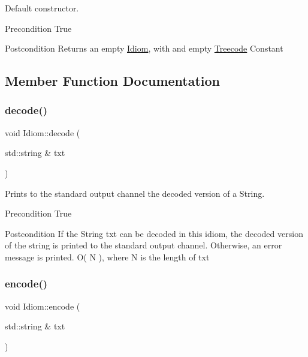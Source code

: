 Default constructor. 

\begin{DoxyPrecond}{Precondition}
True 
\end{DoxyPrecond}
\begin{DoxyPostcond}{Postcondition}
Returns an empty \hyperlink{classIdiom}{Idiom}, with and empty \hyperlink{classTreecode}{Treecode}  Constant 
\end{DoxyPostcond}


\subsection{Member Function Documentation}
\mbox{\label{classIdiom_a82b74f6068e36ad658af962dc01572cf}} 
\subsubsection{\texorpdfstring{decode()}{decode()}}
{\footnotesize\ttfamily void Idiom\+::decode (\begin{DoxyParamCaption}\item[{std\+::string \&}]{txt }\end{DoxyParamCaption})}



Prints to the standard output channel the decoded version of a String. 

\begin{DoxyPrecond}{Precondition}
True 
\end{DoxyPrecond}
\begin{DoxyPostcond}{Postcondition}
If the String txt can be decoded in this idiom, the decoded version of the string is printed to the standard output channel. Otherwise, an error message is printed.  O( N ), where N is the length of txt 
\end{DoxyPostcond}
\mbox{\label{classIdiom_a16a0d83ac00a85cfe6e934eb44a5414a}} 
\subsubsection{\texorpdfstring{encode()}{encode()}}
{\footnotesize\ttfamily void Idiom\+::encode (\begin{DoxyParamCaption}\item[{std\+::string \&}]{txt }\end{DoxyParamCaption})}



